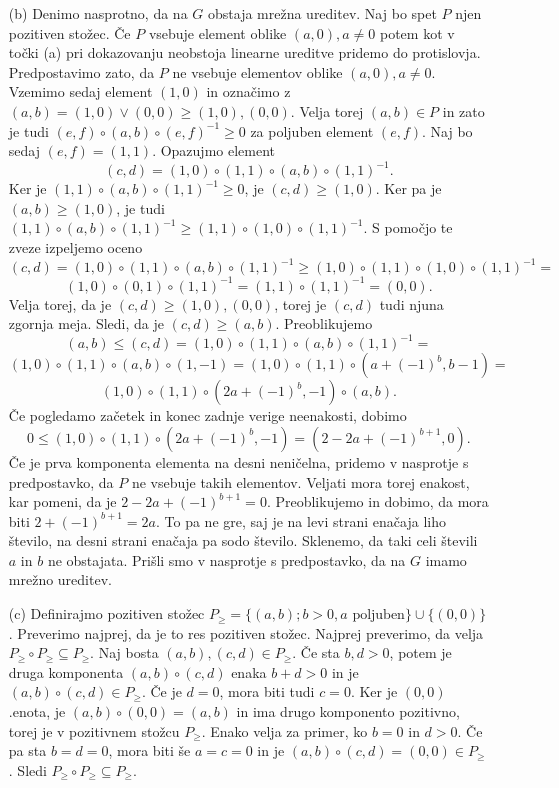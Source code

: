 \documentclass[a4paper, 12pt]{article}
\begin{document}
\begin{enumerate}
\item[(b)] Denimo nasprotno, da na $G$ obstaja mrežna ureditev. Naj bo spet $P$ njen pozitiven stožec. Če $P$ vsebuje element oblike $(a,0), a\neq 0$ potem kot v točki (a) pri dokazovanju neobstoja linearne ureditve pridemo do protislovja. Predpostavimo zato, da $P$ ne vsebuje elementov oblike $(a,0), a\neq 0$. Vzemimo sedaj element $(1,0)$ in označimo z $(a,b) = (1,0) \lor (0,0) \ge (1,0), (0,0)$. Velja torej $(a,b)\in P$ in zato je tudi $(e,f)\circ (a,b)\circ(e,f)^{-1} \ge 0$ za poljuben element $(e,f)$. Naj bo sedaj $(e,f) = (1,1)$. Opazujmo element
$$
(c,d) = (1,0)\circ (1,1)\circ (a,b) \circ (1,1)^{-1}.
$$
Ker je $(1,1)\circ (a,b) \circ (1,1)^{-1} \ge 0$, je $(c,d) \ge (1,0)$. Ker pa je $(a,b) \ge (1,0)$, je tudi $(1,1)\circ(a,b)\circ(1,1)^{-1} \ge (1,1)\circ (1,0) \circ (1,1)^{-1}$. S pomočjo te zveze izpeljemo oceno
$$
(c,d) = (1,0) \circ(1,1) \circ(a,b) \circ(1,1)^{-1} \ge (1,0) \circ (1,1) \circ(1,0) \circ(1,1)^{-1} =
$$
$$
(1,0) \circ (0,1) \circ(1,1)^{-1} = (1,1) \circ (1,1)^{-1} = (0,0).
$$
Velja torej, da je $(c,d) \ge (1,0), (0,0)$, torej je $(c,d)$ tudi njuna zgornja meja. Sledi, da je $(c,d) \ge (a,b)$. Preoblikujemo
$$
(a,b) \le (c,d)  =(1,0) \circ(1,1) \circ (a,b) \circ(1,1)^{-1} = 
$$
$$
(1,0) \circ (1,1) \circ (a,b) \circ (1,-1) = (1,0) \circ (1,1) \circ( a+(-1)^b,b-1) = 
$$
$$
(1,0) \circ (1,1) \circ(2a + (-1)^b, -1) \circ (a,b).
$$
Če pogledamo začetek in konec zadnje verige neenakosti, dobimo
$$
0 \le (1,0) \circ (1,1) \circ(2a + (-1)^b, -1) = (2-2a +(-1)^{b+1},0).
$$
Če je prva komponenta elementa na desni neničelna, pridemo v nasprotje s predpostavko, da $P$ ne vsebuje takih elementov. Veljati mora torej enakost, kar pomeni, da je $2-2a + (-1)^{b+1} = 0$. Preoblikujemo in dobimo, da mora biti $2+(-1)^{b+1} = 2a$. To pa ne gre, saj je na levi strani enačaja liho število, na desni strani enačaja pa sodo število. Sklenemo, da taki celi števili $a$ in $b$ ne obstajata. Prišli smo v nasprotje  s predpostavko, da na $G$ imamo mrežno ureditev.

\item[(c)] Definirajmo pozitiven stožec $P_{\ge} = \{(a,b); b > 0, a \text{ poljuben}\} \cup \{(0,0)\}$. Preverimo najprej, da je to res pozitiven stožec. Najprej preverimo, da velja $P_{\ge} \circ P_{\ge} \subseteq P_{ \ge}$. Naj bosta $(a,b), (c,d) \in P_{\ge}$. Če sta $b,d > 0$, potem je druga komponenta $(a,b)\circ (c,d)$ enaka $b+d > 0$ in je $(a,b)\circ (c,d) \in P_{\ge}$. Če je $d=0$, mora biti tudi $c=0$. Ker je $(0,0)$ .enota, je $(a,b)\circ (0,0) = (a,b)$ in ima drugo komponento pozitivno, torej je v pozitivnem stožcu $P_{\ge}$. Enako velja za primer, ko $b=0$ in $d>0$. Če pa sta $b=d=0$, mora biti še $a=c=0$ in je $(a,b)\circ(c,d) = (0,0) \in P_{\ge}$. Sledi $P_{\ge} \circ P_{\ge} \subseteq P_{\ge}$.


\end{enumerate}
\end{document}
